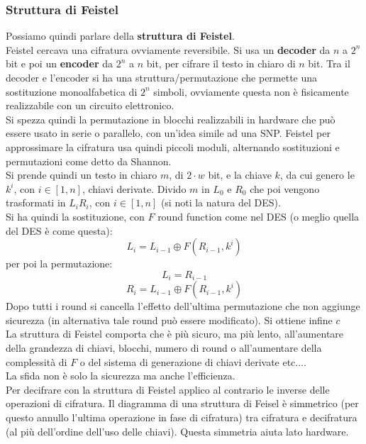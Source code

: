 \documentclass[a4paper,12pt, oneside]{book}
\begin{document}
\subsubsection{Struttura di Feistel}
Possiamo quindi parlare della \textbf{struttura di Feistel}.\\
Feistel cercava una cifratura ovviamente reversibile. Si usa un \textbf{decoder}
da $n$ a $2^n$ bit e poi un \textbf{encoder} da $2^n$ a $n$ bit, per cifrare il
testo in 
chiaro di $n$ bit. Tra il decoder e l'encoder si ha una 
struttura/permutazione che permette una sostituzione monoalfabetica di $2^n$
simboli, ovviamente questa non è fisicamente realizzabile con un circuito
elettronico.\\  
Si spezza quindi la permutazione in blocchi realizzabili in hardware che può
essere usato in serie o parallelo, con un'idea simile ad una SNP. Feistel per
approssimare la cifratura usa quindi piccoli moduli, alternando sostituzioni e
permutazioni come detto da Shannon.\\
Si prende quindi un testo in chiaro $m$, di $2\cdot w$ bit, e la chiave $k$, da
cui genero le $k^i$, con $i\in[1,n]$, chiavi derivate. Divido $m$ in $L_0$ e
$R_0$ che poi vengono trasformati in $L_iR_i$, con $i\in[1,n]$ (si noti la
natura del DES).\\
Si ha quindi la sostituzione, con $F$ round function come nel DES (o meglio
quella del DES è come questa):
\[L_i=L_{i-1}\oplus F(R_{i-1}, k^i)\]
per poi la permutazione:
\[L_i=R_{i-1}\]
\[R_i=L_{i-1}\oplus F(R_{i-1}, k^i)\]
Dopo tutti i round si cancella l'effetto dell'ultima permutazione che non
aggiunge sicurezza (in alternativa tale round può essere modificato). Si ottiene
infine $c$\\
La struttura di Feistel comporta che è più sicuro, ma più lento, all'aumentare
della grandezza di chiavi, blocchi, numero di round o all'aumentare della
complessità di $F$ o del sistema di generazione di chiavi derivate
etc$\ldots$.\\
La sfida non è solo la sicurezza ma anche l'efficienza. \\
Per decifrare con la struttura di Feistel applico al contrario le inverse delle
operazioni di cifratura. Il diagramma di una struttura di Feisel è simmetrico
(per questo annullo l'ultima operazione in fase di cifratura) tra cifratura  e
decifratura (al più dell'ordine dell'uso delle chiavi). Questa simmetria aiuta
lato hardware.
\end{document}
